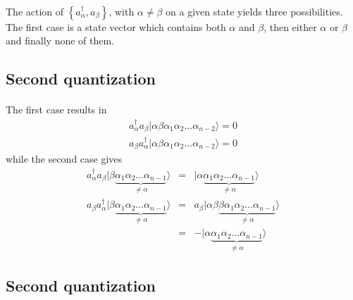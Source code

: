 \documentclass[%
twoside,                 %
final,                   %
10pt]{article}
\begin{document}
\paragraph{}
The action of $\left\{a_\alpha^{\dagger}, a_\beta\right\}$, with 
$\alpha \ne \beta$ on a given state yields three possibilities. 
The first case is a state vector which contains both $\alpha$ and $\beta$, then either 
$\alpha$ or $\beta$ and finally none of them.




\subsection*{Second quantization}

\paragraph{}
The first case results in
\begin{eqnarray}
	a_\alpha^{\dagger} a_\beta |\alpha\beta\alpha_1\alpha_2 \dots \alpha_{n-2}\rangle = 0 \nonumber \\
	a_\beta a_\alpha^{\dagger} |\alpha\beta\alpha_1\alpha_2 \dots \alpha_{n-2}\rangle = 0 \label{eq:2-18a}
\end{eqnarray}
while the second case gives
\begin{eqnarray}
	 a_\alpha^{\dagger} a_\beta |\beta \underbrace{\alpha_1\alpha_2 \dots \alpha_{n-1}}_{\neq \alpha}\rangle &=& 
	 	|\alpha \underbrace{\alpha_1\alpha_2 \dots \alpha_{n-1}}_{\neq  \alpha}\rangle \nonumber \\
	a_\beta a_\alpha^{\dagger} |\beta \underbrace{\alpha_1\alpha_2 \dots \alpha_{n-1}}_{\neq \alpha}\rangle &=&
		a_\beta |\alpha\beta\underbrace{\beta \alpha_1\alpha_2 \dots \alpha_{n-1}}_{\neq \alpha}\rangle \nonumber \\
	&=& - |\alpha\underbrace{\alpha_1\alpha_2 \dots \alpha_{n-1}}_{\neq \alpha}\rangle \label{eq:2-18b}
\end{eqnarray}




\subsection*{Second quantization}

\end{document}
